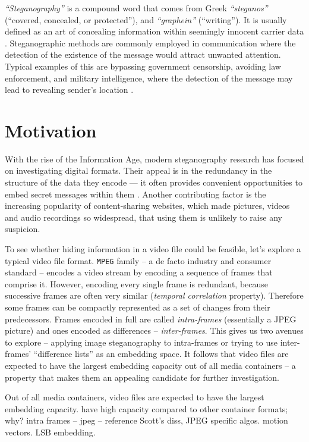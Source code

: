 \documentclass[12pt,british,twoside,notitlepage,usenames,dvipsnames,hypens,final]{report}
\numberwithin{equation}{section}
\numberwithin{figure}{section}
\begin{document}
\emph{``Steganography''} is a compound word that comes from Greek \emph{``steganos''} (``covered, concealed, or protected''), and \emph{``graphein''} (``writing''). It is usually defined as an art of concealing information within seemingly innocent carrier data \cite[p. 3]{fridrich}. Steganographic methods are commonly employed in communication where the detection of the existence of the message would attract unwanted attention. Typical examples of this are bypassing government censorship, avoiding law enforcement, and military intelligence, where the detection of the message may lead to revealing sender's location \cite{infohiding-survey}.
 
\section{Motivation}

With the rise of the Information Age, modern steganography research has focused on investigating digital formats. Their appeal is in the redundancy in the structure of the data they encode --- it often provides convenient opportunities to embed secret messages within them \cite[p. 2]{fridrich}. Another contributing factor is the increasing popularity of content-sharing websites, which made pictures, videos and audio recordings so widespread, that using them is unlikely to raise any suspicion. 

To see whether hiding information in a video file could be feasible, let's explore a typical video file format. \texttt{MPEG} family -- a de facto industry and consumer standard -- encodes a video stream by encoding a sequence of frames that comprise it. However, encoding every single frame is redundant, because successive frames are often very similar (\emph{temporal correlation} property). Therefore some frames can be compactly represented as a set of changes from their predecessors. Frames encoded in full are called \emph{intra-frames} (essentially a JPEG picture) and ones encoded as differences -- \emph{inter-frames}. This gives us two avenues to explore -- applying image steganography to intra-frames or trying to use inter-frames' ``difference lists'' as an embedding space. It follows that video files are expected to have the largest embedding capacity out of all media containers -- a property that makes them an appealing candidate for further investigation.
  

Out of all media containers, video files are expected to have the largest embedding capacity.  have high capacity compared to other container formats; why? intra frames -- jpeg -- reference Scott's diss, JPEG specific algos. motion vectors. LSB embedding. 
\end{document}
